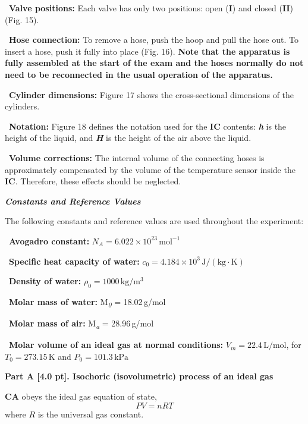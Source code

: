 \textbullet\ \textbf{Valve positions:} Each valve has only two positions: open
(\textbf{I}) and closed (\textbf{II}) (Fig. 15).

\textbullet\ \textbf{Hose connection:} To remove a hose, push the hoop and pull
the hose out. To insert a hose, push it fully into place (Fig. 16).
\textbf{Note that the apparatus is fully assembled at the start of the exam and
the hoses normally do not need to be reconnected in the usual operation of the
apparatus.}

\textbullet\ \textbf{Cylinder dimensions:} Figure 17 shows the cross-sectional
dimensions of the cylinders.

\textbullet\ \textbf{Notation:} Figure 18 defines the notation used for the
\textbf{IC} contents: \textbf{\textit{h}} is the height of the liquid, and
\textbf{\textit{H}} is the height of the air above the liquid.

\textbullet\ \textbf{Volume corrections:} The internal volume of the connecting
hoses is approximately compensated by the volume of the temperature sensor
inside the \textbf{IC}. Therefore, these effects should be neglected.

\textbf{\textit{Constants and Reference Values}}

The following constants and reference values are used throughout the
experiment:

\textbullet\ \textbf{Avogadro constant:} $N_A = 6.022 \times 10^{23}\,\mathrm{mol}^{-1}$

\textbullet\ \textbf{Specific heat capacity of water:} $c_{\mathit{0}} = 4.184 \times 10^{3}\,\mathrm{J/(kg{\cdot}K)}$

\textbullet\ \textbf{Density of water:} $\rho_{\mathit{0}} = 1000\,\mathrm{kg/m^3}$

\textbullet\ \textbf{Molar mass of water:} M\textsubscript{\textit{0}} = 18.02\,g/mol

\textbullet\ \textbf{Molar mass of air:} M\textsubscript{\textit{a}} = 28.96\,g/mol

\textbullet\ \textbf{Molar volume of an ideal gas at normal conditions:}
$V_m = 22.4\,\mathrm{L/mol}$, for $T_{\mathit{0}} = 273.15\,\mathrm{K}$ and
$P_{\mathit{0}} = 101.3\,\mathrm{kPa}$

{\large\textbf{Part A [4.0 pt]. Isochoric (isovolumetric) process of an ideal gas}}

\textbf{CA} obeys the ideal gas equation of state,
\begin{equation}
PV = nRT \tag{1}
\end{equation}
where $R$ is the universal gas constant.

